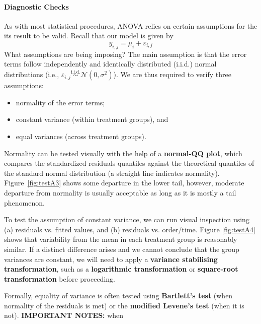 \paragraph{Diagnostic Checks}
As with most statistical procedures, ANOVA relies on certain assumptions for the its result to be valid. Recall that our model is given by
\begin{equation*}
    y_{i,j}=\mu_{i}+\varepsilon_{i,j}
\end{equation*}
What assumptions are being imposing? The main assumption is that the error terms follow independently and identically distributed ({i.i.d.}) normal distributions (i.e., $\varepsilon_{i,j}\stackrel{\text{i.i.d.}}{\sim}\mathcal{N}(0,\sigma^{2})$). We are thus required to verify three assumptions:
\begin{itemize}[noitemsep]
    \item normality of the error terms;
    \item constant variance (within treatment groups), and
    \item equal variances (across treatment groups).
\end{itemize}
Normality can be tested visually with the help of a \textbf{normal-QQ plot}, which compares the standardized residuals quantiles against the theoretical quantiles of the standard normal distribution (a straight line indicates normality). Figure~\ref{fig:testA3} shows some departure in the lower tail, however, moderate departure from normality is usually acceptable as long as it is mostly a tail phenomenon.
\par To test the assumption of constant variance, we can run visual inspection using  (a) residuals vs. fitted values, and (b) residuals vs. order/time. Figure \ref{fig:testA4} shows that variability from the mean in each treatment group is reasonably similar. If a distinct difference arises and we cannot conclude that the group variances are constant, we will need to apply a \textbf{variance stabilising transformation}, such as a \textbf{logarithmic transformation} or \textbf{square-root transformation} before proceeding. \par Formally, equality of variance is often tested using \textbf{Bartlett's test} (when normality of the residuals is met) or the \textbf{modified Levene's test} (when it is not). \newpage\noindent \textbf{IMPORTANT NOTES:} when
